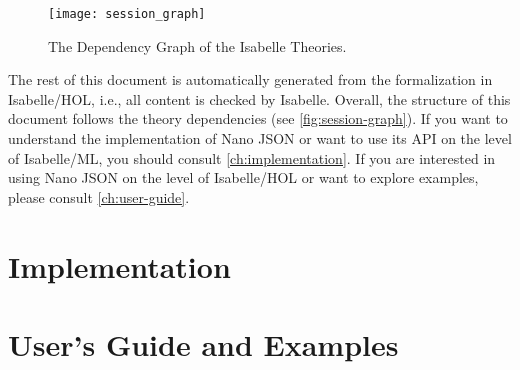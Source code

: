 \documentclass[11pt,DIV=12,a4paper,abstract=true,twoside=semi,openright]
{scrreprt}
\begin{document}
\begin{figure}
  \centering
  \texttt{[image: session\_graph]}
  \caption{The Dependency Graph of the Isabelle Theories.\label{fig:session-graph}}
\end{figure}
The rest of this document is automatically generated from the formalization in Isabelle/HOL, i.e., 
all content is checked by Isabelle.  Overall, the structure of this document follows the theory 
dependencies (see \autoref{fig:session-graph}). If you want  to understand the implementation of 
Nano JSON or want to use its API on the level of Isabelle/ML, you should consult \autoref{ch:implementation}.
If you are interested in using Nano JSON on the level of Isabelle/HOL or want to explore examples, 
please consult \autoref{ch:user-guide}.

\chapter{Implementation}\label{ch:implementation}




\chapter{User's Guide and Examples}\label{ch:user-guide}




%

\printbibliography
\end{document}
